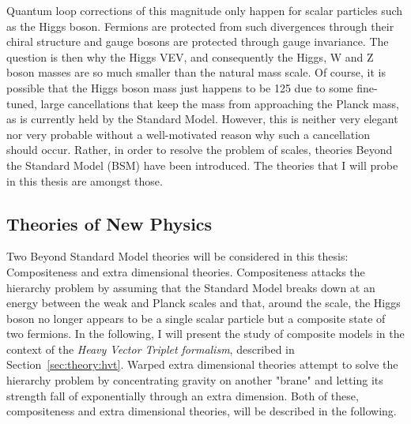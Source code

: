 Quantum loop corrections of this magnitude only happen for scalar particles such as the Higgs boson. Fermions are protected from such divergences through their chiral structure and gauge bosons are protected through gauge invariance. The question is then why the Higgs VEV, and consequently the Higgs, W and Z boson masses are so much smaller than the natural mass scale.\newline
Of course, it is possible that the Higgs boson mass just happens to be 125 \GeV due to some fine-tuned, large cancellations that keep the mass from approaching the Planck mass, as is currently held by the Standard Model. However, this is neither very elegant nor very probable without a well-motivated reason why such a cancellation should occur. Rather, in order to resolve the problem of scales, theories Beyond the Standard Model (BSM) have been introduced. The theories that I will probe in this thesis are amongst those.

\subsection{Theories of New Physics}
Two Beyond Standard Model theories will be considered in this thesis: Compositeness and extra dimensional theories.
Compositeness attacks the hierarchy problem by assuming that the Standard Model breaks down at an energy between the weak and Planck scales and that, around the \TeV scale, the Higgs boson no longer appears to be a single scalar particle but a composite state of two fermions. In the following, I will present the study of composite models in the context of the \emph{Heavy Vector Triplet formalism}, described in Section~\ref{sec:theory:hvt}. Warped extra dimensional theories attempt to solve the hierarchy problem by concentrating gravity on another "brane" and letting its strength fall of exponentially through an extra dimension. Both of these, compositeness and extra dimensional theories, will be described in the following.

